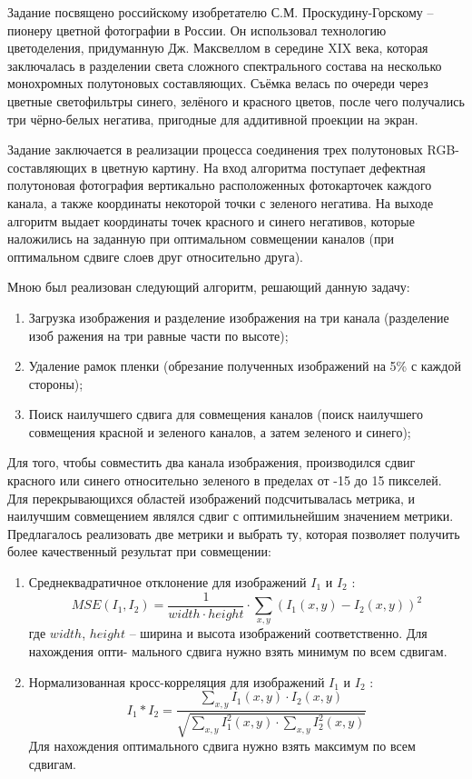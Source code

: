 \documentclass[a4paper, 12pt]{article}
\begin{document}
Задание посвящено российскому изобретателю С.М. Проскудину-Горскому -- пионеру цветной фотографии в России. Он использовал технологию цветоделения, придуманную Дж. Максвеллом в середине XIX века, которая заключалась в разделении света сложного спектрального состава на несколько монохромных полутоновых составляющих. Съёмка велась по очереди через цветные светофильтры синего, зелёного и красного цветов, после чего получались три чёрно-белых негатива, пригодные для аддитивной проекции на экран.

Задание заключается в реализации процесса соединения трех полутоновых RGB-составляющих в цветную картину. На вход алгоритма поступает дефектная полутоновая фотография вертикально расположенных фотокарточек каждого канала, а также координаты некоторой точки с зеленого негатива. На выходе алгоритм выдает координаты точек красного и синего негативов, которые наложились на заданную при оптимальном совмещении каналов (при оптимальном сдвиге слоев друг относительно друга).

Мною был реализован следующий алгоритм, решающий данную задачу:
\begin{enumerate}
	\item Загрузка изображения и разделение изображения на три канала (разделение изоб
	ражения на три равные части по высоте);
	\item Удаление рамок пленки (обрезание полученных изображений  на 5\% с каждой стороны);
	\item Поиск наилучшего сдвига для совмещения каналов (поиск наилучшего совмещения красной и зеленого каналов, а затем зеленого и синего);
\end{enumerate}

Для того, чтобы совместить два канала изображения, производился сдвиг красного или синего относительно зеленого в пределах от -15 до 15 пикселей. Для перекрывающихся областей изображений подсчитывалась метрика, и наилучшим совмещением являлся сдвиг с оптимильнейшим значением метрики. Предлагалось реализовать две метрики и выбрать ту,
которая позволяет получить более качественный результат при совмещении:
\begin{enumerate}
\item Среднеквадратичное отклонение для изображений $I_1$ и $I_2$ :
\[MSE(I_1 , I_2) =\frac{1}{width\cdot height}\cdot
\sum_{x, y}^{} (I_1 (x, y) - I_2 (x, y))^2
\]
где $width$, $height$ -- ширина и высота изображений соответственно. Для нахождения опти-
мального сдвига нужно взять минимум по всем сдвигам.

\item Нормализованная кросс-корреляция для изображений $I_1$ и $I_2$ :
\[I_1*I_2 =\frac
{\sum_{x, y}^{} I_1(x, y) \cdot I_2(x, y)}
{\sqrt{\sum_{x, y}^{} I_1^2(x, y)\cdot 
		\sum_{x, y}^{} I_2^2(x, y)}}
\]
Для нахождения оптимального сдвига нужно взять максимум по всем сдвигам.
\end{enumerate}
\end{document}
